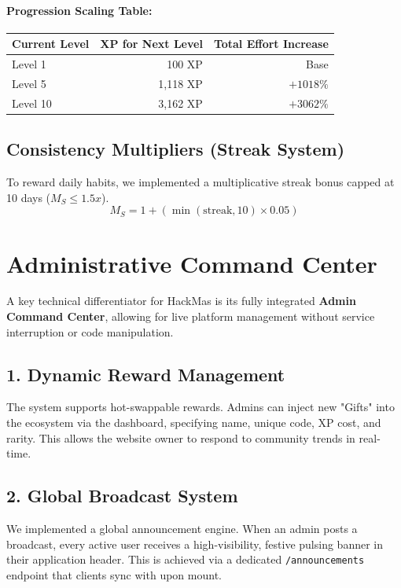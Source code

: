 \documentclass[12pt,a4paper]{article}
\begin{document}
\paragraph{Progression Scaling Table:}
\begin{center}
\begin{tabular}{lrr}
\toprule
\textbf{Current Level} & \textbf{XP for Next Level} & \textbf{Total Effort Increase} \\
\midrule
Level 1 & 100 XP & Base \\
Level 5 & 1,118 XP & $+1018\%$ \\
Level 10 & 3,162 XP & $+3062\%$ \\
\bottomrule
\end{tabular}
\end{center}

\subsection{Consistency Multipliers (Streak System)}
To reward daily habits, we implemented a multiplicative streak bonus capped at 10 days ($M_S \leq 1.5x$).
\begin{equation}
M_S = 1 + (\min(\text{streak}, 10) \times 0.05)
\end{equation}

\section{Administrative Command Center}
A key technical differentiator for HackMas is its fully integrated \textbf{Admin Command Center}, allowing for live platform management without service interruption or code manipulation.

\subsection{1. Dynamic Reward Management}
The system supports hot-swappable rewards. Admins can inject new "Gifts" into the ecosystem via the dashboard, specifying name, unique code, XP cost, and rarity. This allows the website owner to respond to community trends in real-time.

\subsection{2. Global Broadcast System}
We implemented a global announcement engine. When an admin posts a broadcast, every active user receives a high-visibility, festive pulsing banner in their application header. This is achieved via a dedicated \texttt{/announcements} endpoint that clients sync with upon mount.
\end{document}
